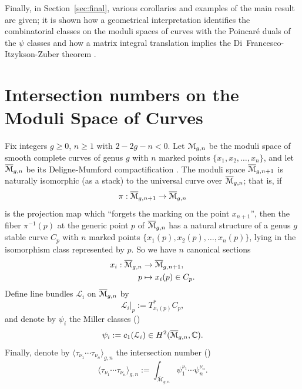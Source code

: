 \documentclass[11pt,twoside]{article}
\theoremstyle{plain}
\theoremstyle{remark}
\theoremstyle{definition}
\numberwithin{equation}{section} %
\newcommand{\M}{\moduli}
\newcommand{\Mbar}{\modulibar}
\begin{document}
Finally, in Section~\ref{sec:final}, various corollaries and examples
of the main result are given; it is shown how a geometrical
interpretation identifies the combinatorial classes on the
moduli spaces of curves with the Poincar{\'e} duals of the
$\psi$ classes and how a matrix integral translation implies the
Di~Francesco-Itzykson-Zuber theorem
\cite{di-francesco-itzykson-zuber;kontsevich-model}.



\section{Intersection numbers on the Moduli Space of Curves}
\label{sec:kontsevich}

Fix integers \(g\geq 0\), \(n\geq 1\) with \(2-2g-n < 0\). Let
\(\M_{g,n}\) be the moduli space of smooth complete curves of genus
\(g\) with \(n\) marked points \(\{x_1,x_2,\dots,x_n\}\), and let
\(\Mbar_{g,n}\) be its Deligne-Mumford compactification
\cite{deligne-mumford}. The moduli space $ \Mbar_{g,n+1}$ is naturally
isomorphic (as a stack) to the universal curve over $\Mbar_{g,n}$;
that is, if
\begin{equation*}
  \pi: \Mbar_{g,n+1} \to \Mbar_{g,n}
\end{equation*}
is the projection map which ``forgets the marking on the point
$x_{n+1}$'', then the fiber $ \pi^{-1}(p)$ at the generic point $p$ of
$ \Mbar_{g,n}$ has a natural structure of a genus $g$ stable curve
$C_p$ with $n$ marked points $ \{x_1(p),x_2(p), \dots,x_n(p) \}$,
lying in the isomorphism class represented by $p$. So we have $n$
canonical sections
\begin{align*}
  x_i: \Mbar_{g,n}& \to \Mbar_{g,n+1}, \\
  p& \mapsto x_i(p) \in C_p.
\end{align*}   
Define line bundles ${\mathcal L}_i$ on $\Mbar_{g,n}$ by
\begin{equation*}
  \left.{\mathcal L}_i \right|_{p}:=T^*_{x_i(p)}C_p,
\end{equation*}
and denote by $ \psi_i$ the Miller classes (\cite{miller, witten;2dgravity, 
kirwan, morita;structure})
\begin{equation*}
  \psi_i:=c_1({\mathcal L}_i) \in H^2(\Mbar_{g,n}, \setC).
\end{equation*}
Finally, denote by $ \langle \tau_{\nu_1} \cdots \tau_{\nu_n}
\rangle_{g,n}$ the intersection number (\cite{witten;2dgravity})
\begin{equation*}
  \langle \tau_{\nu_1} \cdots \tau_{\nu_n} \rangle_{g,n}:=
\int_{\overline{\mathcal
      M}_{g,n}} \psi_1^{\nu_1} \cdots \psi_n^{\nu_n}.
\end{equation*}
\end{document}
